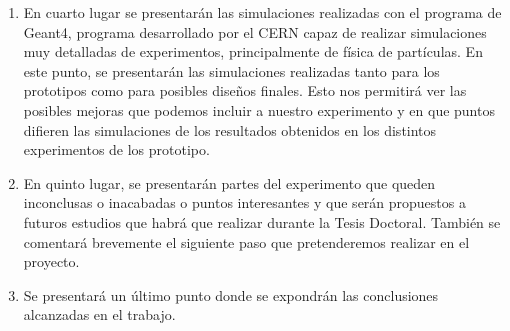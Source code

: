 \begin{enumerate}
\item{} En cuarto lugar se presentarán las simulaciones realizadas con el programa de Geant4\cite{Geant4a,Geant4b,Geant4c}, programa desarrollado por el CERN capaz de realizar simulaciones muy detalladas de experimentos, principalmente de física de partículas. En este punto, se presentarán las simulaciones realizadas tanto para los prototipos como para posibles diseños finales. Esto nos permitirá ver las posibles mejoras que podemos incluir a nuestro experimento y en que puntos difieren  las simulaciones de los resultados obtenidos en los distintos experimentos de los prototipo.

\item{} En quinto lugar, se presentarán partes del experimento que queden inconclusas o inacabadas o puntos interesantes y que serán propuestos a futuros estudios que habrá que realizar durante la Tesis Doctoral. También se comentará brevemente el siguiente paso que pretenderemos realizar en el proyecto.

\item{} Se presentará un último punto donde se expondrán las conclusiones alcanzadas en el trabajo.

\end{enumerate}